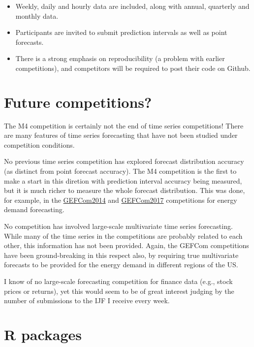 \documentclass[11pt,a4paper,]{article}
\providecommand{\tightlist}{%
  \setlength{\itemsep}{0pt}\setlength{\parskip}{0pt}}
\begin{document}
\begin{itemize}
\tightlist
\item
  Weekly, daily and hourly data are included, along with annual, quarterly and monthly data.
\item
  Participants are invited to submit prediction intervals as well as point forecasts.
\item
  There is a strong emphasis on reproducibility (a problem with earlier competitions), and competitors will be required to post their code on Github.
\end{itemize}

\hypertarget{future-competitions}{%
\section{Future competitions?}\label{future-competitions}}

The M4 competition is certainly not the end of time series competitions! There are many features of time series forecasting that have not been studied under competition conditions.

No previous time series competition has explored forecast distribution accuracy (as distinct from point forecast accuracy). The M4 competition is the first to make a start in this diretion with prediction interval accuracy being measured, but it is much richer to measure the whole forecast distribution. This was done, for example, in the \href{http://www.drhongtao.com/gefcom/2014}{GEFCom2014} and \href{http://www.drhongtao.com/gefcom/2017}{GEFCom2017} competitions for energy demand forecasting.

No competition has involved large-scale multivariate time series forecasting. While many of the time series in the competitions are probably related to each other, this information has not been provided. Again, the GEFCom competitions have been ground-breaking in this respect also, by requiring true multivariate forecasts to be provided for the energy demand in different regions of the US.

I know of no large-scale forecasting competition for finance data (e.g., stock prices or returns), yet this would seem to be of great interest judging by the number of submissions to the IJF I receive every week.

\hypertarget{r-packages}{%
\section{R packages}\label{r-packages}}
\end{document}
